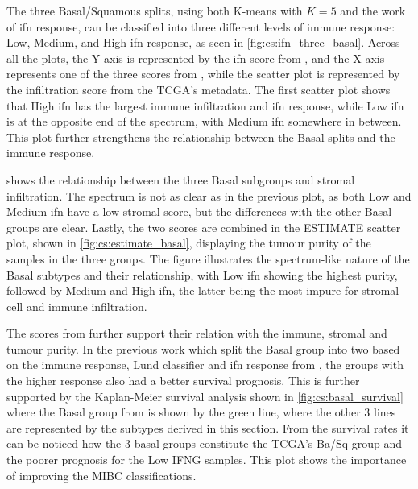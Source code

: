 The three Basal/Squamous splits, using both K-means with \( K = 5 \) and the work of \acrshort{ifn} response, can be classified into three different levels of immune response: Low, Medium, and High \acrshort{ifn} response, as seen in \cref{fig:cs:ifn_three_basal}. Across all the plots, the Y-axis is represented by the \acrshort{ifn} score from \citet{Baker2022-bj}, and the X-axis represents one of the three scores from \citet{Yoshihara2013-wq}, while the scatter plot is represented by the infiltration score from the TCGA's metadata. The first scatter plot shows that High \acrshort{ifn} has the largest immune infiltration and \acrshort{ifn} response, while Low \acrshort{ifn} is at the opposite end of the spectrum, with Medium \acrshort{ifn} somewhere in between. This plot further strengthens the relationship between the Basal splits and the immune response.

 shows the relationship between the three Basal subgroups and stromal infiltration. The spectrum is not as clear as in the previous plot, as both Low and Medium \acrshort{ifn} have a low stromal score, but the differences with the other Basal groups are clear. Lastly, the two scores are combined in the ESTIMATE scatter plot, shown in \cref{fig:cs:estimate_basal}, displaying the tumour purity of the samples in the three groups. The figure illustrates the spectrum-like nature of the Basal subtypes and their relationship, with Low \acrshort{ifn} showing the highest purity, followed by Medium and High \acrshort{ifn}, the latter being the most impure for stromal cell and immune infiltration. 


The scores from \citet{Yoshihara2013-wq} further support their relation with the immune, stromal and tumour purity. In the previous work which split the Basal group into two based on the immune response, Lund classifier \citet{Marzouka2018-ge} and \acrshort{ifn} response from \citet{Baker2022-bj}, the groups with the higher response also had a better survival prognosis. This is further supported by the Kaplan-Meier survival analysis shown in \cref{fig:cs:basal_survival} where the Basal group from \citet{Robertson2017-mg} is shown by the green line, where the other 3 lines are represented by the subtypes derived in this section. From the survival rates it can be noticed how the 3 basal groups constitute the TCGA's Ba/Sq group and the poorer prognosis for the Low IFNG samples. This plot shows the importance of improving the MIBC classifications. 

